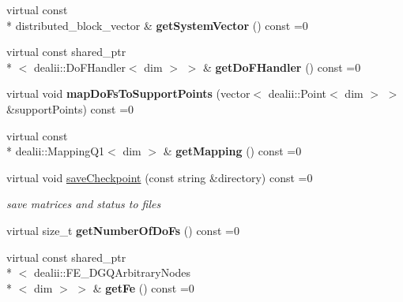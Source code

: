 \begin{DoxyCompactItemize}
\item 
\hypertarget{classnatrium_1_1AdvectionOperator_aa1eb5cd5a2c1b6b3b8f6395bac67ef55}{virtual const \\*
distributed\-\_\-block\-\_\-vector \& {\bfseries get\-System\-Vector} () const =0}\label{classnatrium_1_1AdvectionOperator_aa1eb5cd5a2c1b6b3b8f6395bac67ef55}

\item 
\hypertarget{classnatrium_1_1AdvectionOperator_a68f51edd8cc34b61f32ded0a8db82f7b}{virtual const shared\-\_\-ptr\\*
$<$ dealii\-::\-Do\-F\-Handler$<$ dim $>$ $>$ \& {\bfseries get\-Do\-F\-Handler} () const =0}\label{classnatrium_1_1AdvectionOperator_a68f51edd8cc34b61f32ded0a8db82f7b}

\item 
\hypertarget{classnatrium_1_1AdvectionOperator_adc118010e30df45b5906d35743e5ec2e}{virtual void {\bfseries map\-Do\-Fs\-To\-Support\-Points} (vector$<$ dealii\-::\-Point$<$ dim $>$ $>$ \&support\-Points) const =0}\label{classnatrium_1_1AdvectionOperator_adc118010e30df45b5906d35743e5ec2e}

\item 
\hypertarget{classnatrium_1_1AdvectionOperator_a419e94f5534d7871cee47c027a2501c4}{virtual const \\*
dealii\-::\-Mapping\-Q1$<$ dim $>$ \& {\bfseries get\-Mapping} () const =0}\label{classnatrium_1_1AdvectionOperator_a419e94f5534d7871cee47c027a2501c4}

\item 
virtual void \hyperlink{classnatrium_1_1AdvectionOperator_aca14260bae100874b0050a2a96d7a564}{save\-Checkpoint} (const string \&directory) const =0
\begin{DoxyCompactList}\small\item\em save matrices and status to files \end{DoxyCompactList}\item 
\hypertarget{classnatrium_1_1AdvectionOperator_a251e21d1dd023926d4c5f7fd973b90bf}{virtual size\-\_\-t {\bfseries get\-Number\-Of\-Do\-Fs} () const =0}\label{classnatrium_1_1AdvectionOperator_a251e21d1dd023926d4c5f7fd973b90bf}

\item 
\hypertarget{classnatrium_1_1AdvectionOperator_a7071fd06c15686000f95977e9032d8c6}{virtual const shared\-\_\-ptr\\*
$<$ dealii\-::\-F\-E\-\_\-\-D\-G\-Q\-Arbitrary\-Nodes\\*
$<$ dim $>$ $>$ \& {\bfseries get\-Fe} () const =0}\label{classnatrium_1_1AdvectionOperator_a7071fd06c15686000f95977e9032d8c6}

\end{DoxyCompactItemize}


